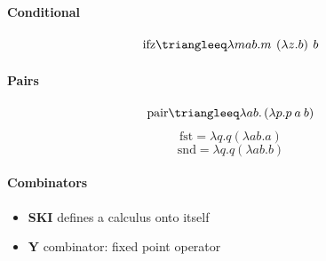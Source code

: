 \documentclass[twocolumn,english]{article}
\begin{document}
\paragraph{Conditional}
\[
\text{ifz} \triangleeq \lambda mab.m\:\left(\lambda z.b\right)\:b
\]
\paragraph{Pairs}
\[
\text{pair} \triangleeq \lambda ab.\left(\lambda p.p\:a\:b\right)
\]
\[
\text{fst} = \lambda q.q\left(\lambda ab.a\right)
\]
\[
\text{snd} = \lambda q.q\left(\lambda ab.b\right)
\]
\paragraph{Combinators}

\begin{itemize}
\item \textbf{SKI} defines a calculus onto itself
\item \textbf{Y} combinator: fixed point operator
\end{itemize}
\end{document}
